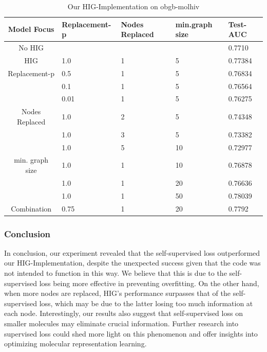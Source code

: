 \begin{table}[ht!]
    \centering
    \caption{Our HIG-Implementation on obgb-molhiv}
    \label{hig_results}
    \begin{tabular}{c || l|l|l|l|}
        Model Focus        & Replacement-p & Nodes Replaced & min.graph size & Test-AUC \\
        \hline
        \hline
        No HIG             &                 &                    &                & 0.7710   \\
        \hline
        HIG       & 1.0             & 1                  & 5              & 0.77384  \\
        \hline
        Replacement-p    & 0.5             & 1                  & 5              & 0.76834  \\
                           & 0.1             & 1                  & 5              & 0.76564  \\
                           & 0.01            & 1                  & 5              & 0.76275   \\
        \hline
        Nodes Replaced & 1.0             & 2                  & 5              & 0.74348  \\
                           & 1.0             & 3                  & 5              & 0.73382  \\
                           & 1.0             & 5                  & 10             & 0.72977  \\
        \hline
        min. graph size    & 1.0             & 1                  & 10             & 0.76878  \\
                           & 1.0             & 1                  & 20             & 0.76636  \\
                           & 1.0             & 1                  & 50             & 0.78039   \\
        \hline
        Combination        & 0.75            & 1                  & 20             & 0.7792  \\
    \end{tabular}
\end{table}

\subsubsection{Conclusion}
In conclusion, our experiment revealed that the self-supervised loss outperformed our HIG-Implementation, despite the unexpected success given that the code was not intended to function in this way. We believe that this is due to the self-supervised loss being more effective in preventing overfitting. On the other hand, when more nodes are replaced, HIG's performance surpasses that of the self-supervised loss, which may be due to the latter losing too much information at each node. Interestingly, our results also suggest that self-supervised loss on smaller molecules may eliminate crucial information. Further research into supervised loss could shed more light on this phenomenon and offer insights into optimizing molecular representation learning.

